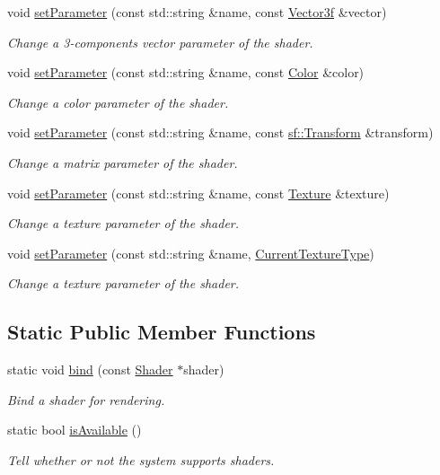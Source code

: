 \begin{DoxyCompactItemize}
void \hyperlink{classsf_1_1Shader_a87d4a0c6dc70ae68aecc0dda3f343c07}{set\-Parameter} (const std\-::string \&name, const \hyperlink{classsf_1_1Vector3}{Vector3f} \&vector)
\begin{DoxyCompactList}\small\item\em Change a 3-\/components vector parameter of the shader. \end{DoxyCompactList}\item 
void \hyperlink{classsf_1_1Shader_aa8618119ed4399df3fd33e78ee96b4fc}{set\-Parameter} (const std\-::string \&name, const \hyperlink{classsf_1_1Color}{Color} \&color)
\begin{DoxyCompactList}\small\item\em Change a color parameter of the shader. \end{DoxyCompactList}\item 
void \hyperlink{classsf_1_1Shader_a39c387cc30e249b22a0c478703b8cc9a}{set\-Parameter} (const std\-::string \&name, const \hyperlink{classsf_1_1Transform}{sf\-::\-Transform} \&transform)
\begin{DoxyCompactList}\small\item\em Change a matrix parameter of the shader. \end{DoxyCompactList}\item 
void \hyperlink{classsf_1_1Shader_a7f58ab5c0a1084f238dfcec86602daa1}{set\-Parameter} (const std\-::string \&name, const \hyperlink{classsf_1_1Texture}{Texture} \&texture)
\begin{DoxyCompactList}\small\item\em Change a texture parameter of the shader. \end{DoxyCompactList}\item 
void \hyperlink{classsf_1_1Shader_af06b4cba0bab915fa01032b063909044}{set\-Parameter} (const std\-::string \&name, \hyperlink{structsf_1_1Shader_1_1CurrentTextureType}{Current\-Texture\-Type})
\begin{DoxyCompactList}\small\item\em Change a texture parameter of the shader. \end{DoxyCompactList}\end{DoxyCompactItemize}
\subsection*{Static Public Member Functions}
\begin{DoxyCompactItemize}
\item 
static void \hyperlink{classsf_1_1Shader_a09778f78afcbeb854d608c8dacd8ea30}{bind} (const \hyperlink{classsf_1_1Shader}{Shader} $\ast$shader)
\begin{DoxyCompactList}\small\item\em Bind a shader for rendering. \end{DoxyCompactList}\item 
static bool \hyperlink{classsf_1_1Shader_ad22474690bafe4a305c1b9826b1bd86a}{is\-Available} ()
\begin{DoxyCompactList}\small\item\em Tell whether or not the system supports shaders. \end{DoxyCompactList}\end{DoxyCompactItemize}
